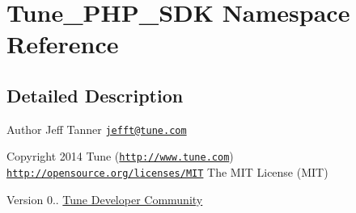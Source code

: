 \hypertarget{namespaceTune__PHP__SDK}{\section{Tune\-\_\-\-P\-H\-P\-\_\-\-S\-D\-K Namespace Reference}
\label{namespaceTune__PHP__SDK}
}


\subsection{Detailed Description}
\begin{DoxyAuthor}{Author}
Jeff Tanner \href{mailto:jefft@tune.com}{\tt jefft@tune.\-com} 
\end{DoxyAuthor}
\begin{DoxyCopyright}{Copyright}
2014 Tune (\href{http://www.tune.com}{\tt http\-://www.\-tune.\-com})  \href{http://opensource.org/licenses/MIT}{\tt http\-://opensource.\-org/licenses/\-M\-I\-T} The M\-I\-T License (M\-I\-T) 
\end{DoxyCopyright}
\begin{DoxyVersion}{Version}
0.. \hyperlink{}{Tune Developer Community } 
\end{DoxyVersion}
